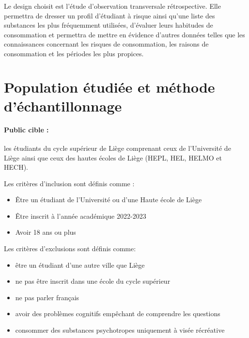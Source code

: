 Le design choisit est l'étude d'observation transversale rétrospective. Elle permettra de dresser un profil d'étudiant à risque ainsi qu'une liste des substances les plus fréquemment utilisées, d'évaluer leurs habitudes de consommation et permettra de mettre en évidence d'autres données telles que les connaissances concernant les risques de consommation, les raisons de consommation et les périodes les plus propices.

\section{Population étudiée et méthode d'échantillonnage}

\paragraph{Public cible :}les étudiants du cycle supérieur de Liège comprenant ceux de l'Université de Liège ainsi que ceux des hautes écoles de Liège (HEPL, HEL, HELMO et HECH).
  
  Les critères d'inclusion sont définis comme :

\begin{itemize}
\item
  Être un étudiant de l'Université ou d'une Haute école de Liège
\item
  Être inscrit à l'année académique 2022-2023
\item
  Avoir 18 ans ou plus
\end{itemize}

Les critères d'exclusions sont définis comme: 
\begin{itemize}
\item être un étudiant d'une autre ville que Liège
\item ne pas être inscrit dans une école du cycle supérieur
\item ne pas parler français
\item avoir des problèmes cognitifs empêchant de comprendre les questions
\item consommer des substances psychotropes uniquement à visée récréative
\end{itemize}

